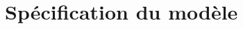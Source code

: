 \documentclass[11pt,a4paper]{article}
\newcommand{\CAB}{\mathit{CAB}}
\newcommand{\EX}{\mathit{EX}}
\newcommand{\IM}{\mathit{IM}}
\newcommand{\TRNG}{\mathit{TRNG}}
\newcommand{\TRF}{\mathit{TRF}}
\newcommand{\tr}{\mathit{tr}}
\begin{document}
	
	
	\section{Spécification du modèle}
\end{document}
